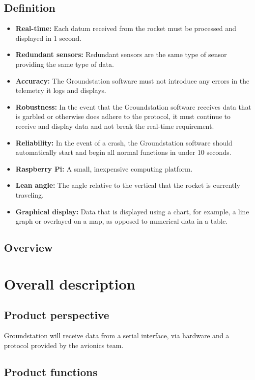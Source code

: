 \documentclass[10pt,journal,draftclsnofoot,onecolumn]{IEEEtran}
\begin{document}
	\subsection{Definition}
	
	\begin{itemize}
		\item \textbf{Real-time:} Each datum received from the rocket must be processed and displayed in 1 second.
		\item \textbf{Redundant sensors:} Redundant sensors are the same type of sensor providing the same type of data.
		\item \textbf{Accuracy:} The Groundstation software must not introduce any errors in the telemetry it logs and displays.
		\item \textbf{Robustness:} In the event that the Groundstation software receives data that is garbled or otherwise does adhere to the protocol, it must continue to receive and display data and not break the real-time requirement.
		\item \textbf{Reliability:} In the event of a crash, the Groundstation software should automatically start and begin all normal functions in under 10 seconds.
		\item \textbf{Raspberry Pi:} A small, inexpensive computing platform.
		\item \textbf{Lean angle:} The angle relative to the vertical that the rocket is currently traveling.
		\item \textbf{Graphical display:} Data that is displayed using a chart, for example, a line graph or overlayed on a map, as opposed to numerical data in a table.
	\end{itemize}	
	
	\subsection{Overview}
		
	
	\section{Overall description}
	\subsection{Product perspective}
	Groundstation will receive data from a serial interface, via hardware and a protocol provided by the avionics team.
	\subsection{Product functions}
	
\end{document}
